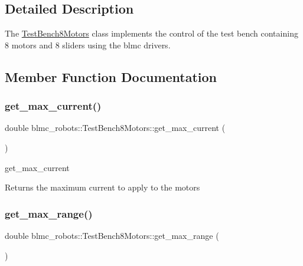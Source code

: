 \subsection{Detailed Description}
The \hyperlink{classblmc__robots_1_1TestBench8Motors}{Test\+Bench8\+Motors} class implements the control of the test bench containing 8 motors and 8 sliders using the blmc drivers. 

\subsection{Member Function Documentation}
\mbox{\label{classblmc__robots_1_1TestBench8Motors_abd3b8a40787ad9e6c019b849da9ca07c}} 
\subsubsection{\texorpdfstring{get\+\_\+max\+\_\+current()}{get\_max\_current()}}
{\footnotesize\ttfamily double blmc\+\_\+robots\+::\+Test\+Bench8\+Motors\+::get\+\_\+max\+\_\+current (\begin{DoxyParamCaption}{ }\end{DoxyParamCaption})\hspace{0.3cm}{\ttfamily [inline]}}



get\+\_\+max\+\_\+current 

\begin{DoxyReturn}{Returns}
the maximum current to apply to the motors 
\end{DoxyReturn}
\mbox{\label{classblmc__robots_1_1TestBench8Motors_a17ac05712b3cb4e63dfd8cdb80b16eea}} 
\subsubsection{\texorpdfstring{get\+\_\+max\+\_\+range()}{get\_max\_range()}}
{\footnotesize\ttfamily double blmc\+\_\+robots\+::\+Test\+Bench8\+Motors\+::get\+\_\+max\+\_\+range (\begin{DoxyParamCaption}{ }\end{DoxyParamCaption})\hspace{0.3cm}{\ttfamily [inline]}}



